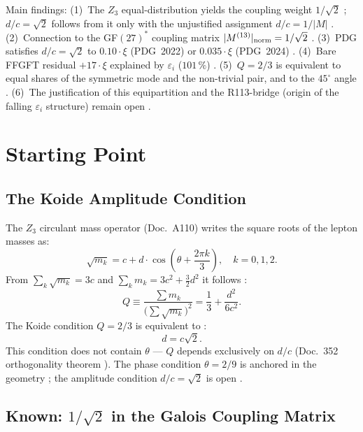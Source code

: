 Main findings: (1)~The $Z_3$ equal-distribution yields the coupling weight
$1/\sqrt{2}$ \BM; $d/c = \sqrt{2}$ follows from it only with the unjustified
assignment $d/c = 1/|M|$ \SM.
(2)~Connection to the GF$(27)^*$ coupling matrix $|M^{(13)}|_{\rm norm} = 1/\sqrt{2}$ \BM.
(3)~PDG satisfies $d/c = \sqrt{2}$ to $0.10\cdot\xi$ (PDG~2022) or $0.035\cdot\xi$ (PDG~2024) \KM.
(4)~Bare FFGFT residual $+17\cdot\xi$ explained by $\varepsilon_i$ ($101\,\%$) \KM.
(5)~$Q = 2/3$ is equivalent to equal shares of the symmetric mode and the
non-trivial pair, and to the $45^\circ$ angle \BM.
(6)~The justification of this equipartition and the R113-bridge (origin of the
falling $\varepsilon_i$ structure) remain open \SM.

\section{Starting Point}

\subsection*{The Koide Amplitude Condition}

The $Z_3$ circulant mass operator (Doc.~A110) writes the square roots of the
lepton masses as:
\begin{equation}
  \sqrt{m_k} = c + d\cdot\cos\!\left(\theta + \frac{2\pi k}{3}\right),
  \quad k = 0,1,2.
  \label{eq:zirk}
\end{equation}
From $\sum_k \sqrt{m_k} = 3c$ and $\sum_k m_k = 3c^2 + \tfrac{3}{2}d^2$ it follows \BM:
\begin{equation}
  Q \equiv \frac{\sum m_k}{\bigl(\sum\sqrt{m_k}\bigr)^2}
  = \frac{1}{3} + \frac{d^2}{6c^2}.
  \label{eq:Q}
\end{equation}
The Koide condition $Q = 2/3$ is equivalent to \BM:
\begin{equation}
  \boxed{d = c\sqrt{2}.}
  \label{eq:bed}
\end{equation}
This condition does not contain $\theta$ --- $Q$ depends exclusively on
$d/c$ (Doc.~352 orthogonality theorem \BM).
The phase condition $\theta = 2/9$ is anchored in the geometry \KM;
the amplitude condition $d/c = \sqrt{2}$ is open \SM.

\subsection*{Known: $1/\sqrt{2}$ in the Galois Coupling Matrix}

